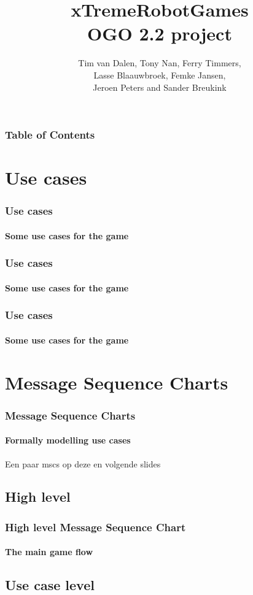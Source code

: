 \documentclass{beamer}
\title{xTremeRobotGames\\\small OGO 2.2 project}
\author{Tim van Dalen, Tony Nan, Ferry Timmers,\\
                Lasse Blaauwbroek, Femke Jansen,\\
                Jeroen Peters and Sander Breukink\\}
\institute[TU/e]{}
\begin{document}
	\frame{\titlepage}
	
	\begin{frame}
	    \frametitle{Table of Contents}
    		\tableofcontents
  	\end{frame}

	\section{Use cases}
	\begin{frame}
		\frametitle{Use cases}
		\framesubtitle{Some use cases for the game}
		
	\end{frame}

    \begin{frame}
		\frametitle{Use cases}
		\framesubtitle{Some use cases for the game}
		
	\end{frame}

    \begin{frame}
		\frametitle{Use cases}
		\framesubtitle{Some use cases for the game}
		
	\end{frame}

	\section{Message Sequence Charts}
	\begin{frame}
		\frametitle{Message Sequence Charts}
		\framesubtitle{Formally modelling use cases}
		Een paar mscs op deze en volgende slides
	\end{frame}
	
	\subsection{High level}
	\begin{frame}
		\frametitle{High level Message Sequence Chart}
		\framesubtitle{The main game flow}
		
	\end{frame}
	\subsection{Use case level}
\end{document}
